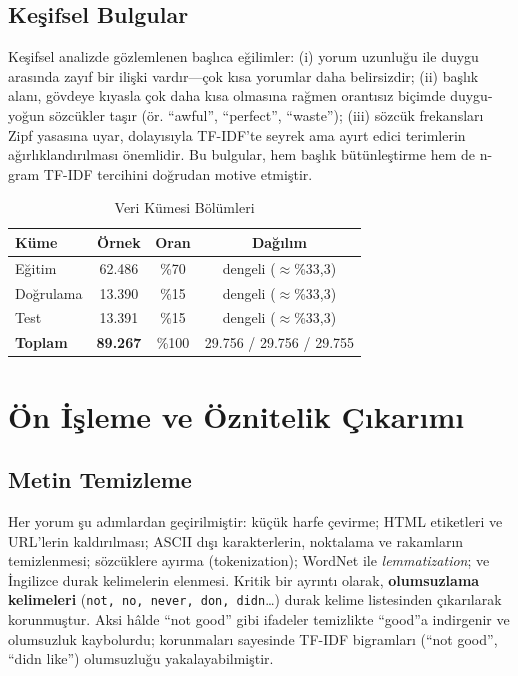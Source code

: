 \documentclass[conference]{IEEEtran}
\begin{document}
\subsection{Keşifsel Bulgular}
Keşifsel analizde gözlemlenen başlıca eğilimler: (i) yorum uzunluğu ile duygu
arasında zayıf bir ilişki vardır---çok kısa yorumlar daha belirsizdir; (ii) başlık
alanı, gövdeye kıyasla çok daha kısa olmasına rağmen orantısız biçimde duygu-yoğun
sözcükler taşır (ör. ``awful'', ``perfect'', ``waste''); (iii) sözcük frekansları
Zipf yasasına uyar, dolayısıyla TF-IDF'te seyrek ama ayırt edici terimlerin
ağırlıklandırılması önemlidir. Bu bulgular, hem başlık bütünleştirme hem de
n-gram TF-IDF tercihini doğrudan motive etmiştir.

\begin{table}[htbp]
\caption{Veri Kümesi Bölümleri}
\label{tab:split}
\centering
\small
\begin{tabular}{lccc}
\toprule
\textbf{Küme} & \textbf{Örnek} & \textbf{Oran} & \textbf{Dağılım}\\
\midrule
Eğitim     & 62.486 & \%70 & dengeli ($\approx$\%33,3)\\
Doğrulama  & 13.390 & \%15 & dengeli ($\approx$\%33,3)\\
Test       & 13.391 & \%15 & dengeli ($\approx$\%33,3)\\
\midrule
\textbf{Toplam} & \textbf{89.267} & \%100 & 29.756 / 29.756 / 29.755\\
\bottomrule
\end{tabular}
\end{table}

\section{Ön İşleme ve Öznitelik Çıkarımı}
\subsection{Metin Temizleme}
Her yorum şu adımlardan geçirilmiştir: küçük harfe çevirme; HTML etiketleri ve
URL'lerin kaldırılması; ASCII dışı karakterlerin, noktalama ve rakamların
temizlenmesi; sözcüklere ayırma (tokenization); WordNet ile
\emph{lemmatization}; ve İngilizce durak kelimelerin elenmesi. Kritik bir
ayrıntı olarak, \textbf{olumsuzlama kelimeleri} (\texttt{not, no, never, don,
didn}\ldots) durak kelime listesinden çıkarılarak korunmuştur. Aksi hâlde ``not
good'' gibi ifadeler temizlikte ``good''a indirgenir ve olumsuzluk kaybolurdu;
korunmaları sayesinde TF-IDF bigramları (``not good'', ``didn like'') olumsuzluğu
yakalayabilmiştir.
\end{document}
